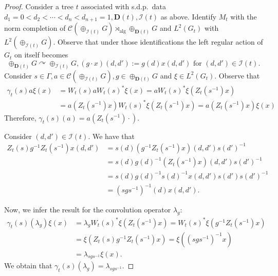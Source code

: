 \documentclass[a4paper,12pt]{amsart}
\numberwithin{equation}{section}
\theoremstyle{definition}
\newcommand{\act}{\curvearrowright}
\DeclareMathOperator{\alg}{alg}
\newcommand{\scrC}{\mathscr C}
\newcommand{\D}{\mathbf D}
\newcommand{\dn}{d_1=0<d_2<\cdots<d_n<d_{n+1}=1}
\newcommand{\ga}{\gamma}
\newcommand{\Ga}{\Gamma}
\newcommand{\cI}{\mathcal I}
\newcommand{\la}{\lambda}
\begin{document}
\begin{proof}
Consider a tree $t$ associated with s.d.p.~data $\dn,\D(t),\cI(t)$ as above.
Identify $M_t$ with the norm completion of $\scrC(\oplus_{\cI(t)} G)\rtimes_{\alg} \oplus_{\D(t)}G$ and $L^2(G_t)$ with $L^2(\oplus_{\cI(t)} G).$ 
Observe that under those identifications the left regular action of $G_t$ on itself becomes 
$$\oplus_{\D(t)}G\act \oplus_{\cI(t)} G, (g\cdot x) (d,d'):= g(d) x(d,d') \text{ for } (d,d')\in \cI(t).$$
Consider $s\in\Ga, a\in\scrC(\oplus_{\cI(t)} G), g\in \oplus_{\D(t)}G$ and $\xi\in L^2(G_t).$
Observe that 
\begin{align*}
\ga_t(s)a\xi(x) & = W_t(s) a W_t(s)^* \xi(x) = a W_t(s)^* \xi(Z_t(s^{-1} ) x)\\
& = a ( Z_t( s^{-1} ) x) W_t(s)^* \xi (Z_t(s^{-1} ) x) = a ( Z_t( s^{-1} ) x) \xi ( x)
\end{align*}
Therefore, $\ga_t(s)(a) = a( Z_t( s^{-1} )  \cdot ).$

Consider $(d,d')\in\cI(t).$
We have that 
\begin{align*}
Z_t(s) g^{-1} Z_t(s^{-1}) x (d,d') & = s(d) (g^{-1} Z_t(s^{-1}) x ) (d,d') s(d')^{-1}\\
& = s(d)g(d)^{-1} (Z_t(s^{-1}) x ) (d,d') s(d')^{-1}\\
& = s(d)g(d)^{-1}s(d)^{-1} x (d,d') s(d') s(d')^{-1}\\
& = (sgs^{-1})^{-1}(d) x (d,d'). 
\end{align*}

Now, we infer the result for the convolution operator $\la_g$:
\begin{align*}
\ga_t(s)(\la_g)\xi(x) & = \la_g W_t(s)^* \xi (Z_t(s^{-1}) x) = W_t(s)^* \xi (g^{-1}Z_t(s^{-1}) x)\\
& =  \xi (Z_t(s) g^{-1}Z_t(s^{-1}) x) = \xi ( (sgs^{-1})^{-1}  x )\\
& = \la_{sgs^{-1}} \xi (x).
\end{align*}
We obtain that $\ga_t(s)(\la_g) = \la_{sgs^{-1}}.$
\end{proof}
\end{document}
